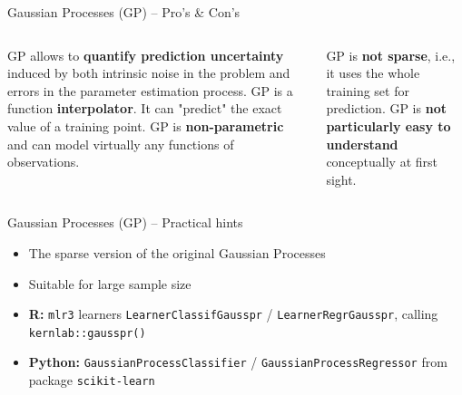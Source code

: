 \begin{frame}{Gaussian Processes (GP) -- Pro's \& Con's}

\begin{columns}[onlytextwidth]
  \begin{column}{0.5\textwidth}
    \footnotesize
    \begin{itemize}
      \positem GP allows to \textbf{quantify prediction uncertainty} induced by both intrinsic noise in the problem and errors in the parameter estimation process.
      \positem GP is a function \textbf{interpolator}. It can "predict" the exact value of a training point.
      \positem GP is \textbf{non-parametric} and can model virtually any functions of observations.
    \end{itemize}
  \end{column}
  \begin{column}{0.5\textwidth}
    \footnotesize
    \begin{itemize}
      \negitem GP is \textbf{not sparse}, i.e., it uses the whole training set for prediction.
      \negitem GP is \textbf{not particularly easy to understand} conceptually at first sight.
    \end{itemize}
  \end{column}
\end{columns}

\vfill

\small


\end{frame}


\begin{frame}{Gaussian Processes (GP) -- Practical hints}

\begin{itemize}
	\item The sparse version of the original Gaussian Processes
	\item Suitable for large sample size
\end{itemize}

\medskip


\begin{itemize}
  \item \textbf{R:} \texttt{mlr3} learners \texttt{LearnerClassifGausspr} /
    \texttt{LearnerRegrGausspr}, calling \texttt{kernlab::gausspr()}
  \item \textbf{Python:} \texttt{GaussianProcessClassifier} /
  \texttt{GaussianProcessRegressor} from package \texttt{scikit-learn}
\end{itemize}

\end{frame}